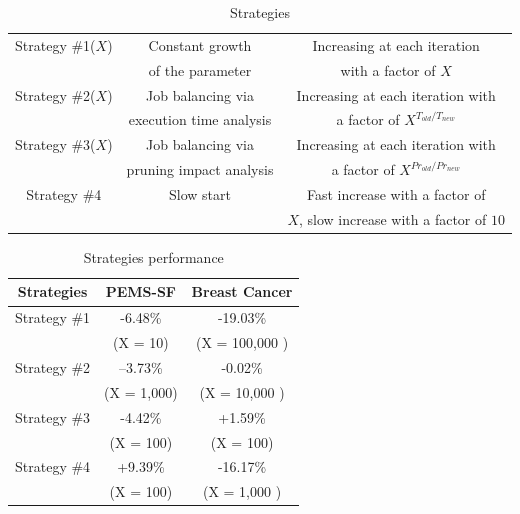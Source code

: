 \begin{table}
\begin{center}
\caption{Strategies}
\label{table_strategies}
\begin{tabular}{|c|c|c|}
\hline
Strategy \#1($X$)  & Constant growth& Increasing at each iteration      \\
            &of the parameter       & with a factor of $X$               \\ \hline

Strategy \#2($X$) & Job balancing via & Increasing at each iteration with \\
       & execution time analysis           & a factor of $X^{T_{old} / T_{new}}$                   \\ \hline


Strategy \#3($X$) & Job balancing via & Increasing at each iteration with \\
              &pruning impact analysis     & a factor of $X^{Pr_{old} / Pr_{new}}$                    \\ \hline
                   Strategy \#4  &Slow start      & Fast increase with a    factor of                  \\
 &    & $X$, slow increase with a factor of $10$                     \\ \hline

\end{tabular}
\end{center}
\end{table}


\begin{table}
\begin{center}
\caption{Strategies performance}
\label{strategies_perf}
\begin{tabular}{ |c| c | c| }
\hline
 Strategies & PEMS-SF& Breast Cancer   \\ \hline \hline
  Strategy \#1 &-6.48\%   &    -19.03\% \\
   &
 (X = 10)  &   (X = 100,000 )   \\ \hline
  Strategy \#2 & --3.73\% &  -0.02\%   \\
      & (X = 1,000)&  (X = 10,000 )    \\ \hline
  Strategy \#3 & -4.42\%  & +1.59\%   \\
      &  (X = 100)&  (X = 100)   \\ \hline
   Strategy \#4 & +9.39\%
 &  -16.17\%   \\
      &(X = 100) & (X = 1,000 )    \\ \hline
\end{tabular}
\end{center}
\end{table}

